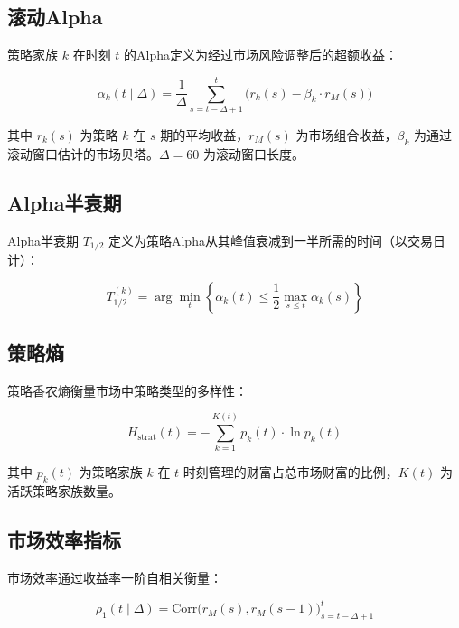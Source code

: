 \subsection{滚动Alpha}

策略家族 $k$ 在时刻 $t$ 的Alpha定义为经过市场风险调整后的超额收益：

\begin{equation}
\alpha_k(t \mid \Delta) = \frac{1}{\Delta} \sum_{s=t-\Delta+1}^{t} \bigl(r_k(s) - \beta_k \cdot r_M(s)\bigr)
\label{eq:alpha}
\end{equation}

其中 $r_k(s)$ 为策略 $k$ 在 $s$ 期的平均收益，$r_M(s)$ 为市场组合收益，$\beta_k$ 为通过滚动窗口估计的市场贝塔。$\Delta = 60$ 为滚动窗口长度。

\subsection{Alpha半衰期}

Alpha半衰期 $T_{1/2}$ 定义为策略Alpha从其峰值衰减到一半所需的时间（以交易日计）：

\begin{equation}
T_{1/2}^{(k)} = \arg\min_t \left\{ \alpha_k(t) \leq \frac{1}{2} \max_{s \leq t} \alpha_k(s) \right\}
\label{eq:halflife}
\end{equation}

\subsection{策略熵}

策略香农熵衡量市场中策略类型的多样性：

\begin{equation}
H_{\text{strat}}(t) = -\sum_{k=1}^{K(t)} p_k(t) \cdot \ln p_k(t)
\label{eq:entropy}
\end{equation}

其中 $p_k(t)$ 为策略家族 $k$ 在 $t$ 时刻管理的财富占总市场财富的比例，$K(t)$ 为活跃策略家族数量。

\subsection{市场效率指标}

市场效率通过收益率一阶自相关衡量：

\begin{equation}
\rho_1(t \mid \Delta) = \text{Corr}\bigl(r_M(s), r_M(s-1)\bigr)_{s=t-\Delta+1}^{t}
\label{eq:efficiency}
\end{equation}

